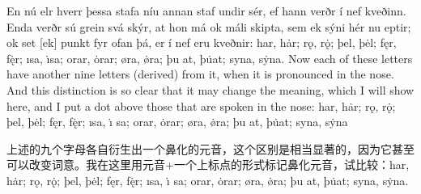 \begin{paracol}{2}
    En nú elr hverr þessa stafa níu annan staf undir sér, ef hann verðr í nef kveðinn. Enda verðr sú grein svá skýr, at hon má ok máli skipta, sem ek sýni hér nu eptir; ok set [ek] punkt fyr ofan þá, er í nef eru kveðnir: har, hȧr; rǫ, rǫ̇; þel, þėl; fęr, fę̇r; ısa, ı̇sa; orar, ȯrar; øra, ø̇ra; þu at, þu̇at; syna, sẏna.
    \switchcolumn
    Now each of these letters have another nine letters (derived) from it, when it is pronounced in the nose. And this distinction is so clear that it may change the meaning, which I will show here, and I put a dot above those that are spoken in the nose: har, hȧr; rǫ, rǫ̇; þel, þėl; fęr, fę̇r; ısa, ı̇ sa; orar, ȯrar; øra, ø̇ra; þu at, þu̇at; syna, sẏna
\end{paracol}
\begin{translation*}{}
    上述的九个字母各自衍生出一个鼻化的元音，这个区别是相当显著的，因为它甚至可以改变词意。我在这里用元音+一个上标点的形式标记鼻化元音，试比较：har, hȧr; rǫ, rǫ̇; þel, þėl; fęr, fę̇r; ısa, ı̇ sa; orar, ȯrar; øra, ø̇ra; þu at, þu̇at; syna, sẏna.
\end{translation*}

